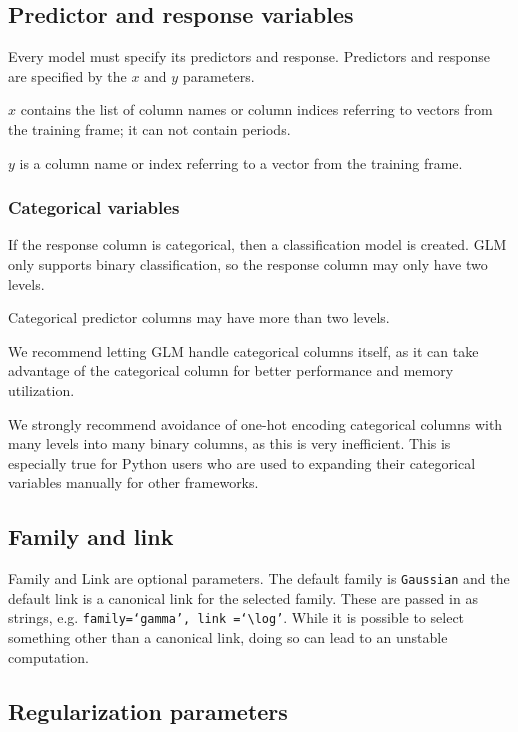\subsection{Predictor and response variables}

Every model must specify its predictors and response.  Predictors and response are specified by the $x$
and $y$ parameters.

$x$ contains the list of column names or column indices referring to vectors from the training frame; it can
not contain periods.

$y$ is a column name or index referring to a vector from the training frame.

\subsubsection{Categorical variables}

If the response column is categorical, then a classification model is created.  GLM only supports binary
classification, so the response column may only have two levels.

Categorical predictor columns may have more than two levels.

We recommend letting GLM handle categorical columns itself, as it can take advantage of the categorical
column for better performance and memory utilization.

We strongly recommend avoidance of one-hot encoding categorical columns with many levels into many binary columns, as this is very inefficient.  This is especially true for Python users who are used to expanding their categorical variables
manually for other frameworks.

\subsection{Family and link}

Family and Link are optional parameters. The default family is \texttt{Gaussian} and the default link is a
canonical link for the selected family. These are passed in as strings, e.g. \texttt{family=`gamma', link =`$\log$'}.
While it is possible to select something other than a canonical link, doing so can lead to an unstable
computation. 

\subsection{Regularization parameters}

